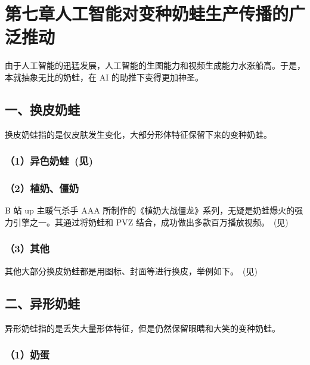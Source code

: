 
\clearpage
\section{第七章\quad 人工智能对变种奶蛙生产传播的广泛推动}

由于人工智能的迅猛发展，人工智能的生图能力和视频生成能力水涨船高。于是，本就抽象无比的奶蛙，在 AI 的助推下变得更加神圣。

\subsection{一、换皮奶蛙}

换皮奶蛙指的是仅皮肤发生变化，大部分形体特征保留下来的变种奶蛙。

\subsubsection[（1）异色奶蛙]{（1）异色奶蛙~(见)}



\subsubsection{（2）植奶、僵奶}

B 站 up 主暖气杀手 AAA 所制作的《植奶大战僵龙》系列，无疑是奶蛙爆火的强力引擎之一。其通过将奶蛙和 PVZ 结合，成功做出多款百万播放视频。~(见)



\subsubsection{（3）其他}

其他大部分换皮奶蛙都是用图标、封面等进行换皮，举例如下。~(见)

\clearpage


\subsection{二、异形奶蛙}

异形奶蛙指的是丢失大量形体特征，但是仍然保留眼睛和大笑的变种奶蛙。

\subsubsection{（1）奶蛋}

